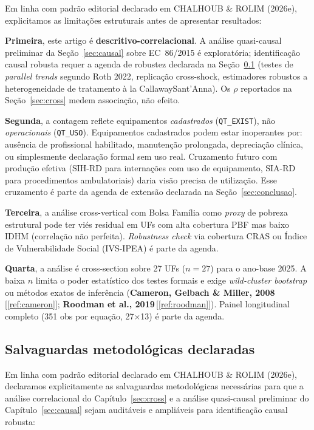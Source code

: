 \documentclass[12pt,a4paper,oneside]{article}
\begin{document}
Em linha com padrão editorial declarado em CHALHOUB \& ROLIM
(2026e), explicitamos as limitações estruturais antes de apresentar
resultados:

\textbf{Primeira}, este artigo é \textbf{descritivo-correlacional}.
A análise quasi-causal preliminar da Seção~\ref{sec:causal} sobre
EC~86/2015 é exploratória; identificação causal robusta requer a
agenda de robustez declarada na Seção~\ref{sub:salvaguardas} (testes
de \textit{parallel trends} segundo Roth 2022, replicação cross-shock,
estimadores robustos a heterogeneidade de tratamento à la
Callaway\textendash Sant'Anna). Os $\rho$ reportados na
Seção~\ref{sec:cross} medem associação, não efeito.

\textbf{Segunda}, a contagem reflete equipamentos
\textit{cadastrados} (\texttt{QT\_EXIST}), não \textit{operacionais}
(\texttt{QT\_USO}). Equipamentos cadastrados podem estar
inoperantes por: ausência de profissional habilitado, manutenção
prolongada, depreciação clínica, ou simplesmente declaração formal
sem uso real. Cruzamento futuro com produção efetiva (SIH-RD para
internações com uso de equipamento, SIA-RD para procedimentos
ambulatoriais) daria visão precisa de utilização. Esse cruzamento
é parte da agenda de extensão declarada na Seção~\ref{sec:conclusao}.

\textbf{Terceira}, a análise cross-vertical com Bolsa Família como
\textit{proxy} de pobreza estrutural pode ter viés residual em UFs
com alta cobertura PBF mas baixo IDHM (correlação não perfeita).
\textit{Robustness check} via cobertura CRAS ou Índice de
Vulnerabilidade Social (IVS-IPEA) é parte da agenda.

\textbf{Quarta}, a análise é cross-section sobre 27 UFs
($n=27$) para o ano-base 2025. A baixa $n$ limita o poder
estatístico dos testes formais e exige \textit{wild-cluster bootstrap}
ou métodos exatos de inferência (\textbf{Cameron, Gelbach \& Miller,
2008}\,[\ref{ref:cameron}]; \textbf{Roodman et al.,
2019}\,[\ref{ref:roodman}]). Painel longitudinal completo
(351 obs por equação, 27$\times$13) é parte da agenda.

\subsection{Salvaguardas metodológicas declaradas}\label{sub:salvaguardas}

Em linha com padrão editorial declarado em CHALHOUB \& ROLIM
(2026e), declaramos explicitamente as salvaguardas metodológicas
necessárias para que a análise correlacional do Capítulo~\ref{sec:cross}
e a análise quasi-causal preliminar do Capítulo~\ref{sec:causal} sejam
auditáveis e ampliáveis para identificação causal robusta:
\end{document}
